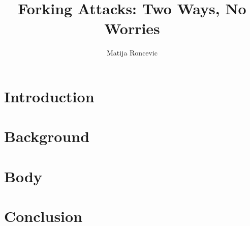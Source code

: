 \documentclass[sigconf]{acmart}
\title{Forking Attacks: Two Ways, No Worries}
\author{Matija Roncevic}
\affiliation{
    \institution{Friedricht-Alexander-Universität Erlangen-Nürnberg}
    \country{}
    \city{}}
\begin{document}
\maketitle  %






\section{Introduction}


\section{Background}


\section{Body}


\section{Conclusion}



\end{document}
